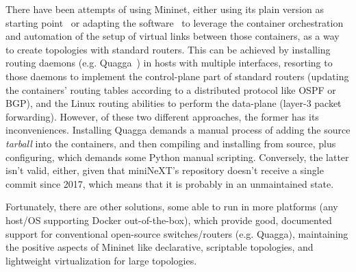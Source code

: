 There have been attempts of using Mininet, either using its plain version as starting point~\cite{mininetquagga,mininetospfbgp} or adapting the software~\cite{mininext} to leverage the container orchestration and automation of the setup of virtual links between those containers, as a way to create topologies with standard routers.
This can be achieved by installing routing daemons (e.g. Quagga~\cite{quagga}) in hosts with multiple interfaces, resorting to those daemons to implement the control-plane part of standard routers (updating the containers' routing tables according to a distributed protocol like OSPF or BGP), and the Linux routing abilities to perform the data-plane (layer-3 packet forwarding). %
However, of these two different approaches, the former has its inconveniences.
Installing Quagga demands a manual process of adding the source \emph{tarball} into the containers, and then compiling and installing from source, plus configuring, which demands some Python manual scripting.
Conversely, the latter isn't valid, either, given that miniNeXT's repository doesn't receive a single commit since 2017, which means that it is probably in an unmaintained state.

Fortunately, there are other solutions, some able to run in more platforms (any host/OS supporting Docker out-of-the-box), which provide good, documented support for conventional open-source switches/routers (e.g. Quagga), maintaining the positive aspects of Mininet like declarative, scriptable topologies, and lightweight virtualization for large topologies.

